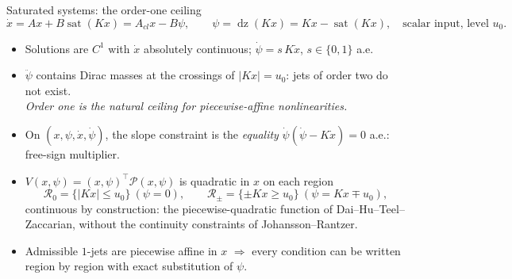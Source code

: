 \documentclass[10pt,aspectratio=169]{beamer}
\newcommand{\tr}{^{\top}}
\newcommand{\PP}{\mathcal{P}}
\newcommand{\dz}{\operatorname{dz}}
\newcommand{\sat}{\operatorname{sat}}
\begin{document}
\begin{frame}{Saturated systems: the order-one ceiling}
\[
\dot x=Ax+B\sat(Kx)=A_{cl}x-B\psi,\qquad\psi=\dz(Kx)=Kx-\sat(Kx),\quad\text{scalar input, level }u_0 .
\]
\begin{itemize}
\item Solutions are $C^1$ with $\dot x$ absolutely continuous; $\dot\psi=s\,K\dot x$, $s\in\{0,1\}$ a.e.
\item $\ddot\psi$ contains \alert{Dirac masses} at the crossings of $|Kx|=u_0$: jets of order two do not exist. \\ \emph{Order one is the natural ceiling for piecewise-affine nonlinearities.}
\item On $(x,\psi,\dot x,\dot\psi)$, the slope constraint is the \emph{equality} $\dot\psi(\dot\psi-K\dot x)=0$ a.e.: free-sign multiplier.
\item $V(x,\psi)=(x,\psi)\tr\PP(x,\psi)$ is quadratic in $x$ on each region
\[
\mathcal R_0=\{|Kx|\le u_0\}\ (\psi=0),\qquad \mathcal R_\pm=\{\pm Kx\ge u_0\}\ (\psi=Kx\mp u_0),
\]
continuous by construction: the piecewise-quadratic function of Dai--Hu--Teel--Zaccarian, without the continuity constraints of Johansson--Rantzer.
\item Admissible $1$-jets are piecewise affine in $x$ $\Rightarrow$ every condition can be written \alert{region by region} with exact substitution of $\psi$.
\end{itemize}
\end{frame}
\end{document}
